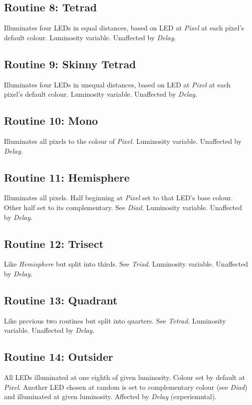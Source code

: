 \documentclass{article}
\begin{document}
	\subsection{Routine 8: Tetrad}
	Illuminates four LEDs in equal distances, based on LED at \emph{Pixel} at 
	each pixel's default colour. Luminosity variable. Unaffected by 
	\emph{Delay.}

	\subsection{Routine 9: Skinny Tetrad}
	Illuminates four LEDs in unequal distances, based on LED at \emph{Pixel} at 
	each pixel's default colour. Luminosity variable. Unaffected by 
	\emph{Delay.}

	\subsection{Routine 10: Mono}
	Illuminates all pixels to the colour of \emph{Pixel.} Luminosity variable. 
	Unaffected by \emph{Delay.}

	\subsection{Routine 11: Hemisphere}
	Illuminates all pixels. Half beginning at \emph{Pixel} set to that LED's 
	base colour. Other half set to its complementary. See \emph{Diad.} 
	Luminosity variable. Unaffected by \emph{Delay.}

	\subsection{Routine 12: Trisect}
	Like \emph{Hemisphere} but split into thirds. See \emph{Triad}. Luminosity 
	variable. Unaffected by \emph{Delay.}

	\subsection{Routine 13: Quadrant}
	Like previous two routines but split into quarters. See \emph{Tetrad.} 
	Luminosity variable. Unaffected by \emph{Delay.}

	\subsection{Routine 14: Outsider}
	All LEDs illuminated at one eighth of given luminosity. Colour set by 
	default at \emph{Pixel}. Another LED chosen at random is set to 
	complementary colour (see \emph{Diad}) and illuminated at given luminosity. 
	Affected by \emph{Delay} (experiemntal).
\end{document}
